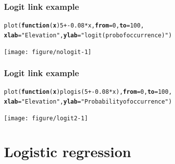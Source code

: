\documentclass[color=usenames,dvipsnames]{beamer}\usepackage[]{graphicx}\usepackage[]{color}
\makeatletter
\newcommand{\hlnum}[1]{\textcolor[rgb]{0.69,0.494,0}{#1}}%
\newcommand{\hlstr}[1]{\textcolor[rgb]{0.749,0.012,0.012}{#1}}%
\newcommand{\hlopt}[1]{\textcolor[rgb]{0,0,0}{#1}}%
\newcommand{\hlstd}[1]{\textcolor[rgb]{0,0,0}{#1}}%
\newcommand{\hlkwa}[1]{\textcolor[rgb]{0,0,0}{\textbf{#1}}}%
\newcommand{\hlkwc}[1]{\textcolor[rgb]{0,0,0}{\textbf{#1}}}%
\newcommand{\hlkwd}[1]{\textcolor[rgb]{0.004,0.004,0.506}{#1}}%
\newenvironment{kframe}{%
 \def\at@end@of@kframe{}%
 \ifinner\ifhmode%
  \def\at@end@of@kframe{\end{minipage}}%
  \begin{minipage}{\columnwidth}%
 \fi\fi%
 \def\FrameCommand##1{\hskip\@totalleftmargin \hskip-\fboxsep
 \colorbox{shadecolor}{##1}\hskip-\fboxsep
     \hskip-\linewidth \hskip-\@totalleftmargin \hskip\columnwidth}%
 \MakeFramed {\advance\hsize-\width
   \@totalleftmargin\z@ \linewidth\hsize
   \@setminipage}}%
 {\par\unskip\endMakeFramed%
 \at@end@of@kframe}
\newenvironment{knitrout}{}{} %
\makeatother
\begin{document}
\begin{frame}[fragile]
  \frametitle{Logit link example}
\begin{knitrout}\scriptsize
{}\color{fgcolor}\begin{kframe}
\begin{alltt}
\hlkwd{plot}\hlstd{(}\hlkwa{function}\hlstd{(}\hlkwc{x}\hlstd{)} \hlnum{5} \hlopt{+ -}\hlnum{0.08}\hlopt{*}\hlstd{x,} \hlkwc{from}\hlstd{=}\hlnum{0}\hlstd{,} \hlkwc{to}\hlstd{=}\hlnum{100}\hlstd{,}
     \hlkwc{xlab}\hlstd{=}\hlstr{"Elevation"}\hlstd{,} \hlkwc{ylab}\hlstd{=}\hlstr{"logit(prob of occurrence)"}\hlstd{)}
\end{alltt}
\end{kframe}
\end{knitrout}
\centering
  \texttt{[image: figure/nologit-1]} \\
\end{frame}




\begin{frame}[fragile]
  \frametitle{Logit link example}
\begin{knitrout}\scriptsize
{}\color{fgcolor}\begin{kframe}
\begin{alltt}
\hlkwd{plot}\hlstd{(}\hlkwa{function}\hlstd{(}\hlkwc{x}\hlstd{)} \hlkwd{plogis}\hlstd{(}\hlnum{5} \hlopt{+ -}\hlnum{0.08}\hlopt{*}\hlstd{x),} \hlkwc{from}\hlstd{=}\hlnum{0}\hlstd{,} \hlkwc{to}\hlstd{=}\hlnum{100}\hlstd{,}
     \hlkwc{xlab}\hlstd{=}\hlstr{"Elevation"}\hlstd{,} \hlkwc{ylab}\hlstd{=}\hlstr{"Probability of occurrence"}\hlstd{)}
\end{alltt}
\end{kframe}
\end{knitrout}
\centering
  \texttt{[image: figure/logit2-1]} \\
\end{frame}





\section{Logistic regression}
\end{document}
